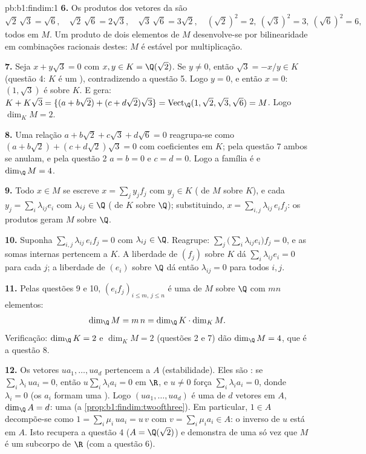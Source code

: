 \begin{solution}{pb:b1:findim:1}
\textbf{6.} Os produtos dos vetores da  são
\[
\sqrt2\,\sqrt3 = \sqrt6,\quad
\sqrt2\,\sqrt6 = 2\sqrt3,\quad
\sqrt3\,\sqrt6 = 3\sqrt2,\quad
(\sqrt2)^2 = 2,\ (\sqrt3)^2 = 3,\ (\sqrt6)^2 = 6,
\]
todos em $M$. Um produto de dois elementos de $M$ desenvolve-se
por bilinearidade em combinações racionais destes: $M$ é estável
por multiplicação.

\textbf{7.} Seja $x + y\sqrt3 = 0$ com $x, y \in K = \Q(\sqrt2)$. Se $y \neq 0$, então $\sqrt3 = -x/y \in K$
(questão 4: $K$ é um ), contradizendo a questão 5. Logo
$y = 0$, e então $x = 0$: $(1,
\sqrt3)$ é  sobre $K$. E gera: $K + K\sqrt3 =
\{(a + b\sqrt2) + (c + d\sqrt2)\sqrt3\} = \operatorname{Vect}_\Q
(1, \sqrt2, \sqrt3, \sqrt6) = M$.
Logo $\dim_K M = 2$.

\textbf{8.} Uma relação $a + b\sqrt2 + c\sqrt3 + d\sqrt6 = 0$ reagrupa-se como $(a + b\sqrt2) + (c + d\sqrt2)\sqrt3 = 0$ com
coeficientes em $K$; pela questão 7 ambos se anulam, e pela
questão 2 $a = b = 0$ e $c = d = 0$. Logo a família é  e $\dim_\Q M
= 4$.

\textbf{9.} Todo $x \in M$ se escreve $x = \sum_j y_j f_j$ com $y_j
\in K$ ( de $M$
sobre $K$), e cada $y_j = \sum_i
\lambda_{ij} e_i$ com $\lambda_{ij} \in \Q$ ( de $K$ sobre $\Q$);
substituindo, $x = \sum_{i,j} \lambda_{ij}\, e_i f_j$: os produtos geram $M$ sobre $\Q$.

\textbf{10.} Suponha $\sum_{i,j} \lambda_{ij}\, e_i f_j = 0$ com $\lambda_{ij} \in \Q$. Reagrupe: $\sum_j \bigl(\sum_i \lambda_{ij}
e_i\bigr) f_j = 0$, e as somas
internas pertencem a $K$. A liberdade de $(f_j)$ sobre $K$ dá
$\sum_i \lambda_{ij} e_i = 0$ para cada $j$; a liberdade de $(e_i)$ sobre $\Q$ dá então
$\lambda_{ij} = 0$ para todos $i, j$.

\textbf{11.} Pelas questões 9 e 10, $(e_i f_j)_{i \leq m,\, j
\leq n}$ é uma  de $M$ sobre
$\Q$ com $mn$ elementos:
\[
\dim_\Q M = m\,n = \dim_\Q K \cdot \dim_K M .
\]
Verificação: $\dim_\Q K = 2$ e $\dim_K M = 2$ (questões 2 e 7) dão $\dim_\Q M = 4$, que é a
questão 8.

\textbf{12.} Os vetores $u a_1, \dots, u a_d$ pertencem a $A$ (estabilidade).
Eles são : se $\sum_i \lambda_i\, u a_i = 0$, então $u \sum_i \lambda_i a_i = 0$ em $\R$, e $u \neq 0$ força
$\sum_i \lambda_i a_i = 0$, donde $\lambda_i = 0$ (os $a_i$ formam uma ). Logo $(u a_1, \dots, u a_d)$ é uma
 de $d$ vetores em $A$, $\dim_\Q A = d$: uma  (a \cref{prop:b1:findim:twoofthree}).
Em particular, $1 \in A$ decompõe-se como $1 = \sum_i \mu_i\, u a_i = u\,v$ com $v = \sum_i
\mu_i a_i \in A$: o
inverso de $u$ está em $A$. Isto recupera a questão 4 ($A = \Q(\sqrt2)$) e
demonstra de uma só vez que $M$ é um subcorpo de $\R$ (com a
questão 6).


\end{solution}
